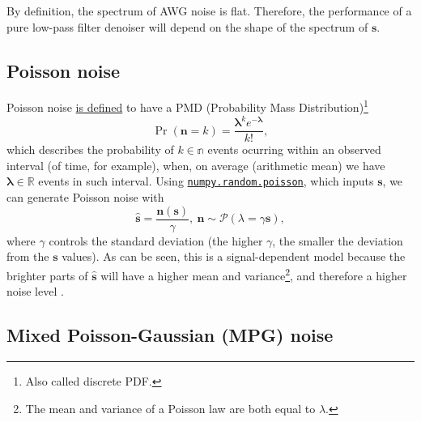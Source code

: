 \documentclass{article}
\begin{document}
By definition, the spectrum of AWG noise is flat. Therefore, the
performance of a pure low-pass filter denoiser will depend on the
shape of the spectrum of $\mathbf{s}$.


\subsection{Poisson noise}

Poisson noise
\href{https://en.wikipedia.org/wiki/Poisson_distribution}{is defined}
to have a PMD (Probability Mass Distribution)\footnote{Also called
  discrete PDF.}
\begin{equation}
  \Pr({\mathbf n}{=}k) = \frac{\mathbf{\lambda}^ke^{-\mathbf{\lambda}}}{k!},
  \label{eq:PN}
\end{equation}
which describes the probability of $k\in\mathbb{n}$ events ocurring
within an observed interval (of time, for example), when, on average
(arithmetic mean) we have ${\mathbf \lambda}\in\mathbb{R}$ events in
such interval. Using
\href{https://numpy.org/doc/stable/reference/random/generated/numpy.random.poisson.html#numpy-random-poisson}{\texttt{numpy.random.poisson}},
which inputs $\mathbf{s}$, we can generate Poisson noise with
\begin{equation}
  \hat{\mathbf{s}} = \frac{\mathbf{n}(\mathbf{s})}{\gamma},~\mathbf{n}\sim\mathcal{P}(\lambda=\gamma\mathbf{s}),
\end{equation}
where $\gamma$ controls the standard deviation (the higher $\gamma$,
the smaller the deviation from the $\mathbf{s}$ values). As can be
seen, this is a signal-dependent model because the brighter parts of
$\hat{\mathbf s}$ will have a higher mean and variance\footnote{The
  mean and variance of a Poisson law are both equal to $\lambda$.},
and therefore a higher noise level \cite{meiniel2018denoising}.


\subsection{Mixed Poisson-Gaussian (MPG) noise}
\end{document}

